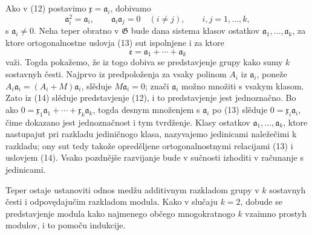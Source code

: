 \documentclass[11pt]{article}
\providecommand{\mG}{\mathfrak G}
\providecommand{\ma}{\mathfrak a}
\providecommand{\me}{\mathfrak e}
\providecommand{\mx}{\mathfrak x}
\begin{document}
Ako v (12) postavimo \(\mx=\ma_i\), dobivamo
\begin{equation}
 \ma_i^2=\ma_i,
 \qquad \ma_i\ma_j=0\quad(i\ne j),
 \qquad i,j=1,\ldots,k,
\tag{13}
\end{equation}
s \(\ma_i\ne0\). Neha teper obratno v \(\mG\) bude dana sistema klasov ostatkov \(\ma_1,\ldots,\ma_k\), za ktore ortogonalnostne uslovja (13) sut ispolnjene i za ktore
\begin{equation}
 \me=\ma_1+\cdots+\ma_k
\tag{14}
\end{equation}
važi. Togda pokažemo, že iz togo dobiva se predstavjenje grupy kako sumy \(k\) sostavnyh česti. Najprvo iz predpoloženja za vsaky polinom \(A_i\) iz \(\ma_i\), poneže \(A_i\ma_i=(A_i+M)\ma_i\), slěduje \(M\ma_i=0\); znači \(\ma_i\) možno množiti s vsakym klasom. Zato iz (14) slěduje predstavjenje (12), i to predstavjenje jest jednoznačno. Bo ako \(0=\mx_1\ma_1+\cdots+\mx_k\ma_k\), togda desnym množenjem s \(\ma_i\) po (13) slěduje \(0=\mx_i\ma_i\), čime dokazano jest jednoznačnost i tym tvrdženje. Klasy ostatkov \(\ma_1,\ldots,\ma_k\), ktore nastupajut pri razkladu jediničnogo klasa, nazyvajemo jedinicami naležečimi k razkladu; ony sut tedy takože opreděljene ortogonalnostnymi relacijami (13) i uslovjem (14). Vsako pozdnějše razvijanje bude v sučnosti izhoditi v računanje s jedinicami.

Teper ostaje ustanoviti odnos medžu additivnym razkladom grupy v \(k\) sostavnyh česti i odpovędajučim razkladom modula. Kako v slučaju \(k=2\), dobude se predstavjenje modula kako najmenego občego mnogokratnogo \(k\) vzaimno prostyh modulov, i to pomoču indukcije.
\end{document}

